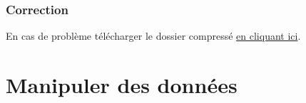 \documentclass[svgnames,11pt]{beamer}
\begin{document}
\begin{frame}
    \frametitle{Correction}

    \begin{center}
        En cas de problème télécharger le dossier compressé 
        \href{https://cviroulaud.github.io/seconde/donnees/geocube-mesures/ressources/donnees-0025.zip}{en cliquant ici}.
    \end{center}

\end{frame}
\begin{frame}
    \frametitle{}

    

\end{frame}
\section{Manipuler des données}
\end{document}
